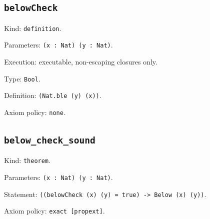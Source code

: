 \documentclass[11pt]{article}
\begin{document}
\subsection*{\texttt{belowCheck}}
\noindent Kind: \texttt{definition}.\par
\noindent Parameters: \texttt{(x : Nat) (y : Nat)}.\par
\noindent Execution: executable, non-escaping closures only.\par
\noindent Type: \texttt{Bool}.\par
\noindent Definition: \texttt{(Nat.ble (y) (x))}.\par
\noindent Axiom policy: \texttt{none}.\par
\subsection*{\texttt{below\_check\_sound}}
\noindent Kind: \texttt{theorem}.\par
\noindent Parameters: \texttt{(x : Nat) (y : Nat)}.\par
\noindent Statement: \texttt{((belowCheck (x) (y) = true) -> Below (x) (y))}.\par
\noindent Axiom policy: \texttt{exact [propext]}.\par
\end{document}

